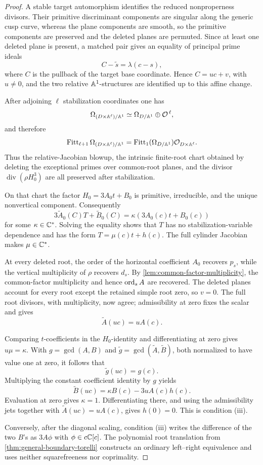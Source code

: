 \begin{proof}
A stable target automorphism identifies the reduced nonproperness divisors.
Their primitive discriminant components are singular along the generic cusp
curve, whereas the plane components are smooth, so the primitive components
are preserved and the deleted planes are permuted.  Since at least one
deleted plane is present, a matched pair gives an equality of principal
prime ideals
\[
C-\widetilde s=\lambda(c-s),
\]
where \(C\) is the pullback of the target base coordinate.  Hence
\(C=uc+v\), with \(u\ne0\), and the two relative \(\mathbb A^1\)-structures are
identified up to this affine change.

After adjoining \(\ell\) stabilization coordinates one has
\[
\Omega_{(D\times\mathbb A^\ell)/\mathbb A^1}
\simeq
\Omega_{D/\mathbb A^1}\oplus\mathcal O^{\,\ell},
\]
and therefore
\[
\operatorname{Fitt}_{\ell+1}
\Omega_{(D\times\mathbb A^\ell)/\mathbb A^1}
=
\operatorname{Fitt}_1(\Omega_{D/\mathbb A^1})
\mathcal O_{D\times\mathbb A^\ell}.
\]
Thus the relative-Jacobian blowup, the intrinsic finite-root chart obtained
by deleting the exceptional primes over common-root planes, and the divisor
\(\operatorname{div}(\rho H_0^3)\) are all preserved after stabilization.

On that chart the factor \(H_0=3A_0t+B_0\) is primitive, irreducible, and
the unique nonvertical component.  Consequently
\[
3\widetilde A_0(C)T+\widetilde B_0(C)
=\kappa(3A_0(c)t+B_0(c))
\]
for some \(\kappa\in\mathbb C^*\).  Solving the equality shows that \(T\) has no
stabilization-variable dependence and has the form
\(T=\mu(c)t+h(c)\).  The full cylinder Jacobian makes
\(\mu\in\mathbb C^*\).

At every deleted root, the order of the horizontal coefficient \(A_0\)
recovers \(p_s\), while the vertical multiplicity of \(\rho\) recovers
\(d_s\).  By \cref{lem:common-factor-multiplicity}, the common-factor
multiplicity and hence \(\operatorname{ord}_sA\) are recovered.  The deleted planes account
for every root except the retained simple root zero, so \(v=0\).  The full
root divisors, with multiplicity, now agree; admissibility at zero fixes the
scalar and gives
\[
\widetilde A(uc)=uA(c).
\]

Comparing \(t\)-coefficients in the \(H_0\)-identity and differentiating at
zero gives \(u\mu=\kappa\).  With \(g=\gcd(A,B)\) and
\(\widetilde g=\gcd(\widetilde A,\widetilde B)\), both normalized to have
value one at zero, it follows that
\[
\widetilde g(uc)=g(c).
\]
Multiplying the constant coefficient identity by \(g\) yields
\[
\widetilde B(uc)=\kappa B(c)-3uA(c)h(c).
\]
Evaluation at zero gives \(\kappa=1\).  Differentiating there, and using the
admissibility jets together with \(\widetilde A(uc)=uA(c)\), gives
\(h(0)=0\).  This is condition (iii).

Conversely, after the diagonal scaling, condition (iii) writes the
difference of the two \(B\)'s as \(3A\phi\) with
\(\phi\in c\mathbb C[c]\).  The polynomial root translation from
\cref{thm:general-boundary-torelli} constructs an ordinary left--right
equivalence and uses neither squarefreeness nor coprimality.
\end{proof}

